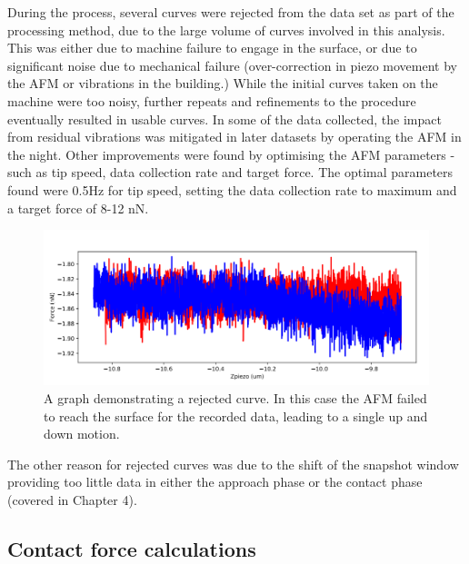  During the process, several curves were rejected from the data set as part of the processing method, due to the large volume of curves involved in this analysis. This was either due to machine failure to engage in the surface, or due to significant noise due to mechanical failure (over-correction in piezo movement by the AFM or vibrations in the building.) While the initial curves taken on the machine were too noisy, further repeats and refinements to the procedure eventually resulted in usable curves. In some of the data collected, the impact from residual vibrations was mitigated in later datasets by operating the AFM in the night. Other improvements were found by optimising the AFM parameters  - such as tip speed, data collection rate and target force. The optimal parameters found were 0.5Hz for tip speed, setting the data collection rate to maximum and a target force of 8-12 nN. 

\begin{figure}
    \centering
    \includegraphics[width=0.65\linewidth]{chapter5/miss_error.png}
    \caption{A graph demonstrating a rejected curve. In this case the AFM failed to reach the surface for the recorded data, leading to a single up and down motion.}
    \label{fig:miss-error}
\end{figure}

The other reason for rejected curves was due to the shift of the snapshot window providing too little data in either the approach phase or the contact phase (covered in Chapter 4). 

\subsection{Contact force calculations}

